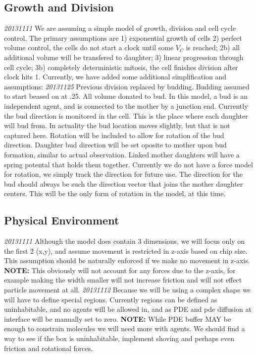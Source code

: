 \documentclass{article}
\begin{document}
\subsection{Growth and Division}
\emph{20131111} We are assuming a simple model of growth, division and cell cycle control\cite{Charvin2009}.
The primary assumptions are 1) exponential growth of cells
2) perfect volume control,
the cells do not start a clock until some $V_C$ is reached;
2b) all additional volume will be transfered to daughter;
3) linear progression through cell cycle;
3b) completely deterministic mitosis, 
the cell finishes division after clock hits 1.
Currently, we have added some additional simplification and assumptions:
\emph{20131125}
Previous division replaced by budding.
Budding assumed to start beased on \cite{Charvin2009} at .25.
All volume donated to bud.
In this model, a bud is an independent agent,
and is connected to the mother by a junction end.
Currently the bud direction is monitored in the cell.
This is the place where each daughter will bud from.
In actuality the bud location moves slightly, but that is not captured here.
Rotation will be included to allow for rotation of the bud direction.
Daughter bud direction will be set oposite to mother upon bud formation, similar to actual observation.
Linked mother daughters will have a spring potental that holds them together.
Currently we do not have a force model for rotation,
we simply track the direction for future use. 
The direction for the bud should always be such the direction vector that joins the mother daughter centers.
This will be the only form of rotation in the model, at this time.


\subsection{Physical Environment}
\emph{20131111} Although the model does contain 3 dimensions,
we will focus only on the first 2 (x,y), 
and assume movement is restricted in z-axis based on chip size.
This assumption should be naturally enforced if we make no movement in z-axis.
\textbf{NOTE:} This obviously will not account for any forces due to the z-axis,
for example making the width smaller will not increase friction and will not effect particle movement at all.
\emph{20131112} Because we will be using a complex shape we will have to define special regions.
Currently regions can be defined as uninhabitable, and no agents will be allowed in, and
as PDE and pde diffusion at interface will be manually set to zero.
\textbf{NOTE:} While PDE buffer MAY be enough to constrain molecules we will need more with agents.
We should find a way to see if the box is uninhabitable, 
implement shoving and perhaps even friction and rotational forces.
\end{document}
